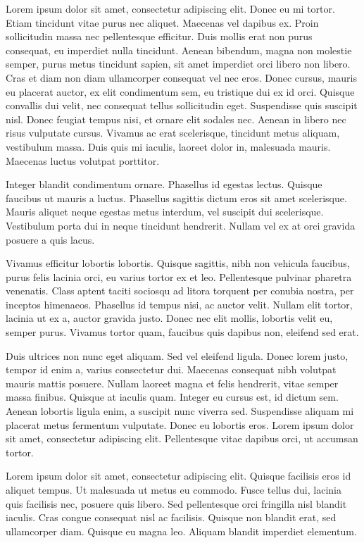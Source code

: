 \documentclass[twocolumn]{IEEEtran}
\begin{document}
Lorem ipsum dolor sit amet, consectetur adipiscing elit. Donec eu mi tortor. Etiam tincidunt vitae purus nec aliquet. Maecenas vel dapibus ex. Proin sollicitudin massa nec pellentesque efficitur. Duis mollis erat non purus consequat, eu imperdiet nulla tincidunt. Aenean bibendum, magna non molestie semper, purus metus tincidunt sapien, sit amet imperdiet orci libero non libero. Cras et diam non diam ullamcorper consequat vel nec eros. Donec cursus, mauris eu placerat auctor, ex elit condimentum sem, eu tristique dui ex id orci. Quisque convallis dui velit, nec consequat tellus sollicitudin eget. Suspendisse quis suscipit nisl. Donec feugiat tempus nisi, et ornare elit sodales nec. Aenean in libero nec risus vulputate cursus. Vivamus ac erat scelerisque, tincidunt metus aliquam, vestibulum massa. Duis quis mi iaculis, laoreet dolor in, malesuada mauris. Maecenas luctus volutpat porttitor.

Integer blandit condimentum ornare. Phasellus id egestas lectus. Quisque faucibus ut mauris a luctus. Phasellus sagittis dictum eros sit amet scelerisque. Mauris aliquet neque egestas metus interdum, vel suscipit dui scelerisque. Vestibulum porta dui in neque tincidunt hendrerit. Nullam vel ex at orci gravida posuere a quis lacus.

Vivamus efficitur lobortis lobortis. Quisque sagittis, nibh non vehicula faucibus, purus felis lacinia orci, eu varius tortor ex et leo. Pellentesque pulvinar pharetra venenatis. Class aptent taciti sociosqu ad litora torquent per conubia nostra, per inceptos himenaeos. Phasellus id tempus nisi, ac auctor velit. Nullam elit tortor, lacinia ut ex a, auctor gravida justo. Donec nec elit mollis, lobortis velit eu, semper purus. Vivamus tortor quam, faucibus quis dapibus non, eleifend sed erat.

Duis ultrices non nunc eget aliquam. Sed vel eleifend ligula. Donec lorem justo, tempor id enim a, varius consectetur dui. Maecenas consequat nibh volutpat mauris mattis posuere. Nullam laoreet magna et felis hendrerit, vitae semper massa finibus. Quisque at iaculis quam. Integer eu cursus est, id dictum sem. Aenean lobortis ligula enim, a suscipit nunc viverra sed. Suspendisse aliquam mi placerat metus fermentum vulputate. Donec eu lobortis eros. Lorem ipsum dolor sit amet, consectetur adipiscing elit. Pellentesque vitae dapibus orci, ut accumsan tortor.

Lorem ipsum dolor sit amet, consectetur adipiscing elit. Quisque facilisis eros id aliquet tempus. Ut malesuada ut metus eu commodo. Fusce tellus dui, lacinia quis facilisis nec, posuere quis libero. Sed pellentesque orci fringilla nisl blandit iaculis. Cras congue consequat nisl ac facilisis. Quisque non blandit erat, sed ullamcorper diam. Quisque eu magna leo. Aliquam blandit imperdiet elementum.
\end{document}
